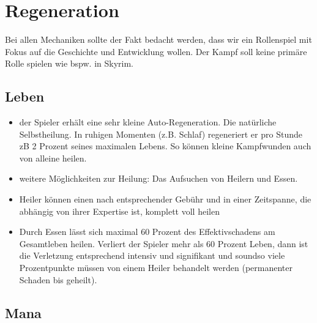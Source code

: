 \chapter{Regeneration}
Bei allen Mechaniken sollte der Fakt bedacht werden, dass wir ein Rollenspiel mit Fokus auf die Geschichte und Entwicklung wollen. Der Kampf soll keine primäre Rolle spielen wie bspw. in Skyrim.

\section{Leben}
\begin{itemize}
	\item der Spieler erhält eine sehr kleine Auto-Regeneration. Die natürliche Selbstheilung. In ruhigen Momenten (z.B. Schlaf) regeneriert er pro Stunde zB 2 Prozent seines maximalen Lebens. So können kleine Kampfwunden auch von alleine heilen.
	\item weitere Möglichkeiten zur Heilung: Das Aufsuchen von Heilern und Essen.
	\item Heiler können einen nach entsprechender Gebühr und in einer Zeitspanne, die abhängig von ihrer Expertise ist, komplett voll heilen
	\item Durch Essen lässt sich maximal 60 Prozent des Effektivschadens am Gesamtleben heilen. Verliert der Spieler mehr als 60 Prozent Leben, dann ist die Verletzung entsprechend intensiv und signifikant und soundso viele Prozentpunkte müssen von einem Heiler behandelt werden (permanenter Schaden bis geheilt).
\end{itemize}

\section{Mana}

